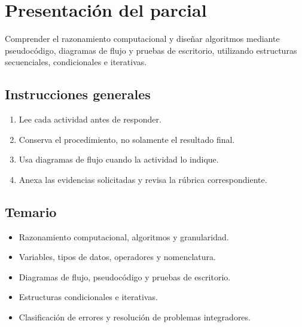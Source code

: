 \section{Presentación del parcial}

\begin{objetivo}
Comprender el razonamiento computacional y diseñar algoritmos mediante
pseudocódigo, diagramas de flujo y pruebas de escritorio, utilizando
estructuras secuenciales, condicionales e iterativas.
\end{objetivo}

\subsection{Instrucciones generales}

\begin{enumerate}[leftmargin=*,label=\arabic*.]
  \item Lee cada actividad antes de responder.
  \item Conserva el procedimiento, no solamente el resultado final.
  \item Usa diagramas de flujo cuando la actividad lo indique.
  \item Anexa las evidencias solicitadas y revisa la rúbrica correspondiente.
\end{enumerate}

\subsection{Temario}

\begin{itemize}[leftmargin=*]
  \item Razonamiento computacional, algoritmos y granularidad.
  \item Variables, tipos de datos, operadores y nomenclatura.
  \item Diagramas de flujo, pseudocódigo y pruebas de escritorio.
  \item Estructuras condicionales e iterativas.
  \item Clasificación de errores y resolución de problemas integradores.
\end{itemize}
